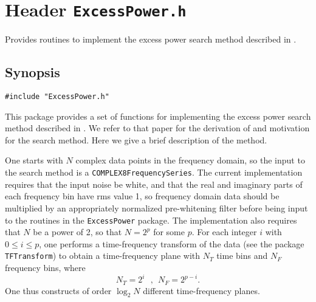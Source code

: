 \section{Header \texttt{ExcessPower.h}}
\label{s:ExcessPower.h}

Provides routines to implement the excess power search method 
described in \cite{abcf:2000}. 

\subsection*{Synopsis}
\begin{verbatim}
#include "ExcessPower.h"
\end{verbatim}

This package provides a set of functions for implementing the excess power
search method described in \cite{abcf:2000}.  We refer to that paper for the
derivation of and motivation for the search method.  Here we give a brief
description of the method.

One starts with $N$ complex data points in the frequency domain, so the input
to the search method is a \verb+COMPLEX8FrequencySeries+.  The current
implementation requires that the input noise be white, and that the real and
imaginary parts of each frequency bin have rms value 1, so frequency domain
data should be multiplied by an appropriately normalized pre-whitening filter
before being input to the routines in the \verb+ExcessPower+ package.  The
implementation also requires that $N$ be a power of 2, so that $N =2^p$ for
some $p$.  For each integer $i$ with $0 \le i \le p$, one performs a
time-frequency transform of the data (see the package \verb+TFTransform+) to
obtain a time-frequency plane with $N_T$ time bins and $N_F$ frequency bins,
where
\begin{equation}
  N_T = 2^i \ \ \ , \ \ N_F = 2^{p-i}.
  \label{tfplanes}
\end{equation}
One thus constructs of order $\log_2 N$ different time-frequency planes. 

